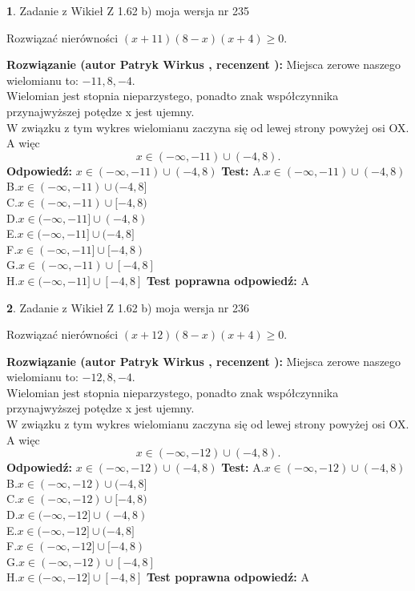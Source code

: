 \documentclass[12pt, a4paper]{article}
\theoremstyle{definition} %
\newtheorem{zad}{}
\newcommand{\zadStart}[1]{\begin{zad}#1\newline}
\newcommand{\zadStop}{\end{zad}}
\newcommand{\rozwStart}[2]{\noindent \textbf{Rozwiązanie (autor #1 , recenzent #2): }\newline}
\newcommand{\rozwStop}{\newline}
\newcommand{\odpStart}{\noindent \textbf{Odpowiedź:}\newline}
\newcommand{\odpStop}{\newline}
\newcommand{\testStart}{\noindent \textbf{Test:}\newline}
\newcommand{\testStop}{\newline}
\newcommand{\kluczStart}{\noindent \textbf{Test poprawna odpowiedź:}\newline}
\newcommand{\kluczStop}{\newline}
\begin{document}
\zadStart{Zadanie z Wikieł Z 1.62 b) moja wersja nr 235}

Rozwiązać nierówności $(x+11)(8-x)(x+4)\ge0$.
\zadStop
\rozwStart{Patryk Wirkus}{}
Miejsca zerowe naszego wielomianu to: $-11, 8, -4$.\\
Wielomian jest stopnia nieparzystego, ponadto znak współczynnika przy\linebreak najwyższej potędze x jest ujemny.\\ W związku z tym wykres wielomianu zaczyna się od lewej strony powyżej osi OX. A więc $$x \in (-\infty,-11) \cup (-4,8).$$
\rozwStop
\odpStart
$x \in (-\infty,-11) \cup (-4,8)$
\odpStop
\testStart
A.$x \in (-\infty,-11) \cup (-4,8)$\\
B.$x \in (-\infty,-11) \cup (-4,8]$\\
C.$x \in (-\infty,-11) \cup [-4,8)$\\
D.$x \in (-\infty,-11] \cup (-4,8)$\\
E.$x \in (-\infty,-11] \cup (-4,8]$\\
F.$x \in (-\infty,-11] \cup [-4,8)$\\
G.$x \in (-\infty,-11) \cup [-4,8]$\\
H.$x \in (-\infty,-11] \cup [-4,8]$
\testStop
\kluczStart
A
\kluczStop



\zadStart{Zadanie z Wikieł Z 1.62 b) moja wersja nr 236}

Rozwiązać nierówności $(x+12)(8-x)(x+4)\ge0$.
\zadStop
\rozwStart{Patryk Wirkus}{}
Miejsca zerowe naszego wielomianu to: $-12, 8, -4$.\\
Wielomian jest stopnia nieparzystego, ponadto znak współczynnika przy\linebreak najwyższej potędze x jest ujemny.\\ W związku z tym wykres wielomianu zaczyna się od lewej strony powyżej osi OX. A więc $$x \in (-\infty,-12) \cup (-4,8).$$
\rozwStop
\odpStart
$x \in (-\infty,-12) \cup (-4,8)$
\odpStop
\testStart
A.$x \in (-\infty,-12) \cup (-4,8)$\\
B.$x \in (-\infty,-12) \cup (-4,8]$\\
C.$x \in (-\infty,-12) \cup [-4,8)$\\
D.$x \in (-\infty,-12] \cup (-4,8)$\\
E.$x \in (-\infty,-12] \cup (-4,8]$\\
F.$x \in (-\infty,-12] \cup [-4,8)$\\
G.$x \in (-\infty,-12) \cup [-4,8]$\\
H.$x \in (-\infty,-12] \cup [-4,8]$
\testStop
\kluczStart
A
\kluczStop
\end{document}
